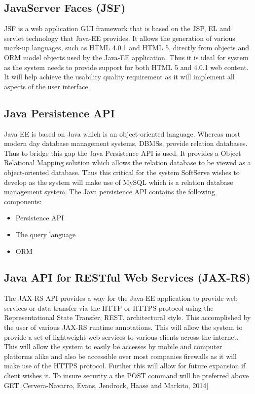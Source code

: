 \documentclass[12pt]{article}
\begin{document}
\subsection{JavaServer Faces (JSF)}
JSF is a web application GUI framework that is based on the JSP, EL and servlet technology that Java-EE provides. It allows the generation of various mark-up languages, such as HTML 4.0.1 and HTML 5, directly from objects and ORM model objects used by the Java-EE application. Thus it is ideal for system as the system needs to provide support for both HTML 5 and 4.0.1 web content.\\

It will help achieve the usability quality requirement as it will implement all aspects of the user interface.

\subsection{Java Persistence API}
Java EE is based on Java which is an object-oriented language. Whereas most modern day database management systems, DBMSs, provide relation databases. Thus to bridge this gap the Java Persistence API is used. It provides a Object Relational Mapping solution which allows the relation database to be viewed as a object-oriented database. Thus this critical for the system SoftServe wishes to develop as the system will make use of MySQL which is a relation database management system. The Java persistence API contains the following components:  
\begin{itemize}
\item Persistence API
\item The query language
\item ORM
\end{itemize}
\subsection{Java API for RESTful Web Services (JAX-RS)}
The JAX-RS API provides a way for the Java-EE application to provide web services or data transfer via the HTTP or HTTPS protocol using the Representational State Transfer, REST, architectural style. This accomplished by the user of various JAX-RS runtime annotations. This will allow the system to provide a set of lightweight web services to various clients across the internet. This will allow the system to easily be accesses by mobile and computer platforms alike and also be accessible over most companies firewalls as it will make use of the HTTPS protocol. Further this will allow for future expansion if client wishes it. To insure security a the POST command will be preferred above GET.[Cervera-Navarro, Evans, Jendrock, Haase and Markito, 2014]
\end{document}
